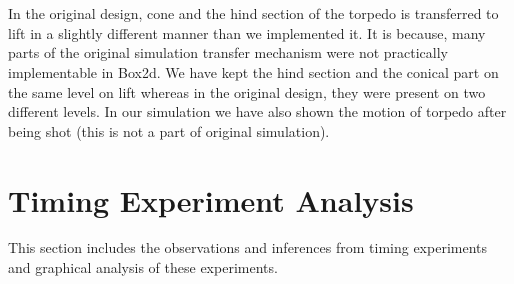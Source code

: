 \documentclass[11pt]{article}
\begin{document}
 \hspace{100 pt}{\it Original Design} \hspace{150 pt}{\it Design made in Box2d} \\\\
In the original design, cone and the hind section of the torpedo is transferred to lift in a slightly different manner than we implemented it.
It is because, many parts of the original simulation transfer mechanism were not practically implementable in Box2d. We have kept the hind section and
the conical part on the same level on lift whereas in the original design, they were present on two different levels.
In our simulation we have also shown the motion of torpedo after being shot (this is not a part of original simulation).
\section{Timing Experiment Analysis}
This section includes the observations and inferences from timing experiments and graphical analysis of these experiments.
\end{document}
